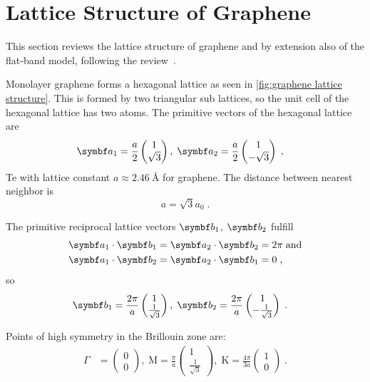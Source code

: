 \documentclass[../main.tex]{subfiles}
\begin{document}
\section{Lattice Structure of Graphene}\label{sec:lattice-structure-of-graphene}

This section reviews the lattice structure of graphene and by extension also of the flat-band model, following the review~\cite{yangStructureGrapheneIts2018}.

Monolayer graphene forms a hexagonal lattice as seen in \cref{fig:graphene lattice structure}.
This is formed by two triangular sub lattices, so the unit cell of the hexagonal lattice has two atoms.
The primitive vectors of the hexagonal lattice are
\begin{align}
	\vb{a}_1 &= \frac{a}{2} \begin{pmatrix} 1 \\ \sqrt{3} \end{pmatrix} ,\;
	\vb{a}_2 = \frac{a}{2} \begin{pmatrix} 1 \\ -\sqrt{3} \end{pmatrix}
	\;,
\end{align}
Te
with lattice constant \(a \approx \qty{2.46}{\angstrom}\) for graphene.
The distance between nearest neighbor is
\begin{equation}
	a = \sqrt{3} a_0 \;.
\end{equation}

The primitive reciprocal lattice vectors \(\vb{b}_1\), \(\vb{b}_2\) fulfill
\begin{align}
	\vb{a}_1 \cdot \vb{b}_1 &= \vb{a}_2 \cdot \vb{b}_2 = 2\pi \; \text{and} \notag\\
	\vb{a}_1 \cdot \vb{b}_2 &= \vb{a}_2 \cdot \vb{b}_1 = 0
	\;,
\end{align}
so
\begin{align}
	\vb{b}_1 &= \frac{2\pi}{a} \begin{pmatrix} 1 \\ \frac{1}{\sqrt{3}} \end{pmatrix} ,\;
	\vb{b}_2 = \frac{2\pi}{a} \begin{pmatrix} 1 \\ - \frac{1}{\sqrt{3}} \end{pmatrix}
	\;.
\end{align}

Points of high symmetry in the Brillouin zone are:
\begin{align}
	\Gamma &= \begin{pmatrix} 0 \\ 0 \end{pmatrix} ,\;
	\mathrm{M} = \frac{\pi}{a} \begin{pmatrix} 1 \\ \frac{1}{\sqrt{3}} \end{pmatrix} ,\;
	\mathrm{K} = \frac{4\pi}{3 a} \begin{pmatrix} 1 \\ 0 \end{pmatrix} \;.
\end{align}
\end{document}
